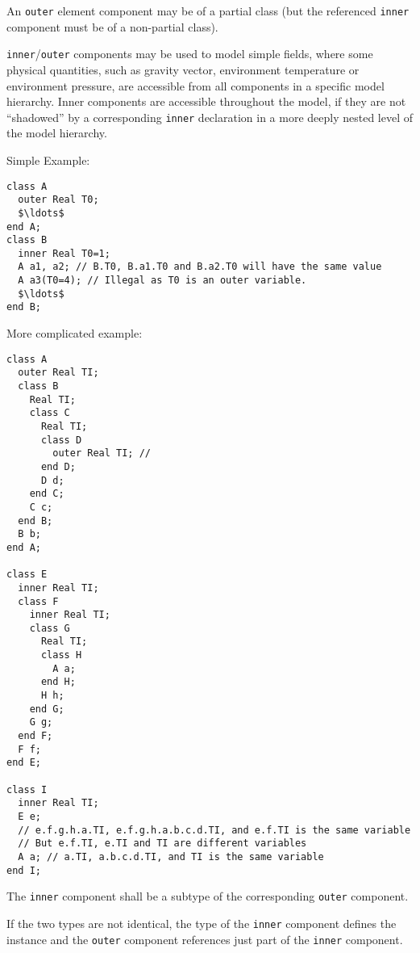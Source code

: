 An \lstinline!outer! element component may be of a partial class (but the referenced \lstinline!inner! component must be of a non-partial class).

\begin{nonnormative}
\lstinline!inner!/\lstinline!outer! components may be used to model simple fields, where some physical quantities, such as gravity vector, environment temperature or environment pressure, are accessible from all components in a specific model hierarchy.
Inner components are accessible throughout the model, if they are not ``shadowed'' by a corresponding \lstinline!inner! declaration in a more deeply nested level of the model hierarchy.
\end{nonnormative}

\begin{example}
Simple Example:
\begin{lstlisting}[language=modelica]
class A
  outer Real T0;
  $\ldots$
end A;
class B
  inner Real T0=1;
  A a1, a2; // B.T0, B.a1.T0 and B.a2.T0 will have the same value
  A a3(T0=4); // Illegal as T0 is an outer variable.
  $\ldots$
end B;
\end{lstlisting}
More complicated example:
\begin{lstlisting}[language=modelica]
class A
  outer Real TI;
  class B
    Real TI;
    class C
      Real TI;
      class D
        outer Real TI; //
      end D;
      D d;
    end C;
    C c;
  end B;
  B b;
end A;

class E
  inner Real TI;
  class F
    inner Real TI;
    class G
      Real TI;
      class H
        A a;
      end H;
      H h;
    end G;
    G g;
  end F;
  F f;
end E;

class I
  inner Real TI;
  E e;
  // e.f.g.h.a.TI, e.f.g.h.a.b.c.d.TI, and e.f.TI is the same variable
  // But e.f.TI, e.TI and TI are different variables
  A a; // a.TI, a.b.c.d.TI, and TI is the same variable
end I;
\end{lstlisting}
\end{example}

The \lstinline!inner! component shall be a subtype of the corresponding \lstinline!outer! component.

\begin{nonnormative}
If the two types are not identical, the type of the \lstinline!inner! component defines the instance and the \lstinline!outer! component references just part of the
\lstinline!inner! component.
\end{nonnormative}

